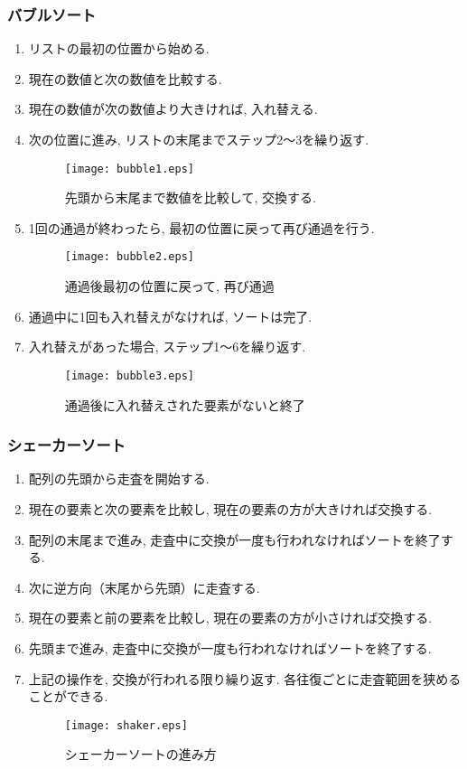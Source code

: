 \documentclass[a4j, 12pt]{jarticle}
\begin{document}
\subsubsection{バブルソート}
\begin{enumerate}
  \item リストの最初の位置から始める. 
  \item 現在の数値と次の数値を比較する. 
  \item 現在の数値が次の数値より大きければ, 入れ替える. 
  \item 次の位置に進み, リストの末尾までステップ2〜3を繰り返す. 
  \begin{figure}[H]
    \centering
    \texttt{[image: bubble1.eps]}
    \caption{先頭から末尾まで数値を比較して, 交換する. }
  \end{figure}
  \item 1回の通過が終わったら, 最初の位置に戻って再び通過を行う. 
  \begin{figure}[H]
    \centering
    \texttt{[image: bubble2.eps]}
    \caption{通過後最初の位置に戻って, 再び通過}
  \end{figure}
  \item 通過中に1回も入れ替えがなければ, ソートは完了. 
  \item 入れ替えがあった場合, ステップ1〜6を繰り返す. 
  \begin{figure}[H]
    \centering
    \texttt{[image: bubble3.eps]}
    \caption{通過後に入れ替えされた要素がないと終了}
  \end{figure}
\end{enumerate}
\subsubsection{シェーカーソート}
\begin{enumerate}
  \item 配列の先頭から走査を開始する. 
  \item 現在の要素と次の要素を比較し, 現在の要素の方が大きければ交換する. 
  \item 配列の末尾まで進み, 走査中に交換が一度も行われなければソートを終了する. 
  \item 次に逆方向（末尾から先頭）に走査する. 
  \item 現在の要素と前の要素を比較し, 現在の要素の方が小さければ交換する. 
  \item 先頭まで進み, 走査中に交換が一度も行われなければソートを終了する. 
  \item 上記の操作を, 交換が行われる限り繰り返す. 各往復ごとに走査範囲を狭めることができる. 
  \begin{figure}[H]
    \centering
    \texttt{[image: shaker.eps]}
    \caption{シェーカーソートの進み方}
  \end{figure}
\end{enumerate}
\newpage
\end{document}
